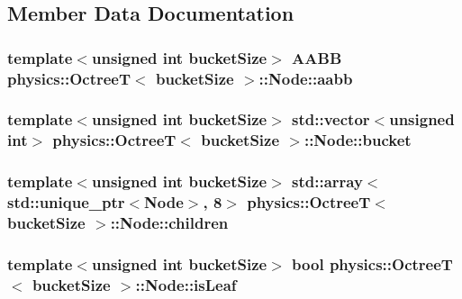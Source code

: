 \subsection{Member Data Documentation}
\hypertarget{structphysics_1_1OctreeT_1_1Node_a196e782e59a6c25f4127da0a6e8d2500}{
\subsubsection[{aabb}]{\setlength{\rightskip}{0pt plus 5cm}template$<$unsigned int bucket\-Size$>$ {\bf A\-A\-B\-B} {\bf physics\-::\-Octree\-T}$<$ bucket\-Size $>$\-::Node\-::aabb}}\label{structphysics_1_1OctreeT_1_1Node_a196e782e59a6c25f4127da0a6e8d2500}
\hypertarget{structphysics_1_1OctreeT_1_1Node_a840c88e6152af0423b988c3f83365180}{
\subsubsection[{bucket}]{\setlength{\rightskip}{0pt plus 5cm}template$<$unsigned int bucket\-Size$>$ std\-::vector$<$unsigned int$>$ {\bf physics\-::\-Octree\-T}$<$ bucket\-Size $>$\-::Node\-::bucket}}\label{structphysics_1_1OctreeT_1_1Node_a840c88e6152af0423b988c3f83365180}
\hypertarget{structphysics_1_1OctreeT_1_1Node_ae36b0966ac5fce06093003d8b6350d74}{
\subsubsection[{children}]{\setlength{\rightskip}{0pt plus 5cm}template$<$unsigned int bucket\-Size$>$ std\-::array$<$std\-::unique\-\_\-ptr$<${\bf Node}$>$, 8$>$ {\bf physics\-::\-Octree\-T}$<$ bucket\-Size $>$\-::Node\-::children}}\label{structphysics_1_1OctreeT_1_1Node_ae36b0966ac5fce06093003d8b6350d74}
\hypertarget{structphysics_1_1OctreeT_1_1Node_a69a0bf4b2fabbd8cdabc4a9510ce9978}{
\subsubsection[{is\-Leaf}]{\setlength{\rightskip}{0pt plus 5cm}template$<$unsigned int bucket\-Size$>$ bool {\bf physics\-::\-Octree\-T}$<$ bucket\-Size $>$\-::Node\-::is\-Leaf}}\label{structphysics_1_1OctreeT_1_1Node_a69a0bf4b2fabbd8cdabc4a9510ce9978}
